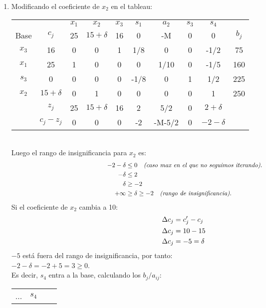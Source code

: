 \begin{enumerate}
	\item 
		Modificando el coeficiente de $x_2$ en el tableau:
		\begin{table}[ht]
			\centering
			\begin{tabular}{ cc|ccccccc|c }
				& & $x_1$ & $x_2$ & $x_3$ & $s_1$ & $a_2$ & $s_3$ & $s_4$ &\\ 
				Base & $c_j$ & 25 & $15 + \delta$ & 16 & 0 & -M & 0 & 0 & $b_j$ \\
				\hline
				$x_3$ & 16 & 0 & 0 & 1 & 1/8 & 0 & 0 & -1/2 & 75 \\ 
				$x_1$ & 25 & 1 & 0 & 0 & 0 & 1/10 & 0 & -1/5 & 160 \\
				$s_3$ & 0  & 0 & 0 & 0 & -1/8 & 0 & 1 & 1/2 & 225 \\
				$x_2$ & $15 + \delta$ & 0 & 1 & 0 & 0 & 0 & 0 & 1 & 250 \\
				\hline
				& $z_j$ & 25 & $15 + \delta$ & 16 & 2 & 5/2 & 0 & $2 + \delta$ &  \\ 
				& $c_j - z_j$ & 0 & 0 & 0 & -2 & -M-5/2 & 0 & $-2-\delta$ & \\ 
			  \end{tabular}
		\end{table}
		\\Luego el rango de insignificancia para $x_2$ es:
		\begin{align*}
			\hspace{5.33cm}
				-2-\delta &\leq 0  	\quad\emph{(caso max en el que no seguimos iterando)}.\\
				-\delta &\leq 2 \\
				\delta &\geq -2 \\ 
				+\infty &\geq \delta \geq -2 	\quad\emph{(rango de insignificancia)}.
		\end{align*}
		Si el coeficiente de $x_2$ cambia a 10:
		\begin{align*}
			\hspace{5.33cm}
				\Delta{c_j} &= c_j' - c_j \\
			  	\Delta{c_j} &= 10 - 15 \\ 
			  	\Delta{c_j} &= -5 = \delta
		\end{align*}
	  	$-5$ está fuera del rango de insignificancia, por tanto: $-2 - \delta = -2 + 5 = 3 \geq 0$.
		\\Es decir, $s_4$ entra a la base, calculando los $b_j/a_{ij}:$
		\begin{table}[ht]
			\centering
			\begin{tabular}{ cc|cc }
				... & $s_4$ & & \\

\end{tabular}
\end{table}
\end{enumerate}
